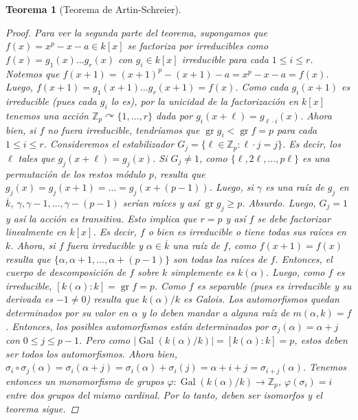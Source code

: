 \documentclass[12pt]{book}
\newtheorem{teo}{Teorema}[section]
\theoremstyle{definition}
\newcommand{\ZZ}{\mathbb{Z}}      %
\DeclareMathOperator{\gr}{gr}
\DeclareMathOperator{\Gal}{Gal}
\def\acts{\curvearrowright}
\begin{document}
\begin{teo}[Teorema de Artin-Schreier]
\begin{proof}
Para ver la segunda parte del teorema, supongamos que $f(x)=x^p - x - a\in k[x]$ se factoriza por irreducibles como $f(x)=g_1(x)\ldots g_r(x)$ con $g_i\in k[x]$ irreducible para cada $1\leq i\leq r$. Notemos que $f(x+1) = (x+1)^p - (x+1) - a = x^p - x - a = f(x)$. Luego, $f(x+1) = g_1(x+1)\ldots g_r(x+1) = f(x)$. Como cada $g_i(x+1)$ es irreducible (pues cada $g_i$ lo es), por la unicidad de la factorización en $k[x]$ tenemos una acción $\ZZ_p\acts \{1,\ldots , r\}$ dada por $g_i(x+\ell) = g_{\ell\cdot i}(x)$. Ahora bien, si $f$ no fuera irreducible, tendríamos que $\gr g_i < \gr f = p$ para cada $1\leq i\leq r$. Consideremos el estabilizador $G_j = \{\ell\in\ZZ_p : \ell\cdot j = j\}$. Es decir, los $\ell$ tales que $g_j(x+\ell) = g_j(x)$. Si $G_j\neq 1$, como $\{\ell,2\ell,\ldots , p\ell\}$ es una permutación de los restos módulo $p$, resulta que $g_j(x)=g_j(x+1)=\ldots = g_j(x + (p-1))$. Luego, si $\gamma$ es una raíz de $g_j$ en $\overline{k}$, $\gamma, \gamma-1,\ldots , \gamma-(p-1)$ serían raíces y así $\gr g_j\geq p$. Absurdo. Luego, $G_j=1$ y así la acción es transitiva. Esto implica que $r=p$ y así $f$ se debe factorizar linealmente en $k[x]$. Es decir, $f$ o bien es irreducible o tiene todas sus raíces en $k$. Ahora, si $f$ fuera irreducible y $\alpha\in\overline{k}$ una raíz de $f$, como $f(x+1)=f(x)$ resulta que $\{\alpha,\alpha+1,\ldots , \alpha+(p-1)\}$ son todas las raíces de $f$. Entonces, el cuerpo de descomposición de $f$ sobre $k$ simplemente es $k(\alpha)$. Luego, como $f$ es irreducible, $[k(\alpha):k]=\gr f = p$. Como $f$ es separable (pues es irreducible y su derivada es $-1\neq 0$) resulta que $k(\alpha)/k$ es Galois. Los automorfismos quedan determinados por su valor en $\alpha$ y lo deben mandar a alguna raíz de $m(\alpha,k)=f$. Entonces, los posibles automorfismos están determinados por $\sigma_j(\alpha)=\alpha+j$ con $0\leq j\leq p-1$. Pero como $|\Gal(k(\alpha)/k)| = [k(\alpha):k]=p$, estos deben ser todos los automorfismos. Ahora bien, $\sigma_i\circ\sigma_j(\alpha) = \sigma_i(\alpha+j)=\sigma_i(\alpha)+\sigma_i(j) = \alpha + i+j = \sigma_{i+j}(\alpha)$. Tenemos entonces un monomorfismo de grupos $\varphi:\Gal(k(\alpha)/k)\to \ZZ_p$, $\varphi(\sigma_i)=i$ entre dos grupos del mismo cardinal. Por lo tanto, deben ser isomorfos y el teorema sigue.
\end{proof}
\end{teo}
\end{document}
